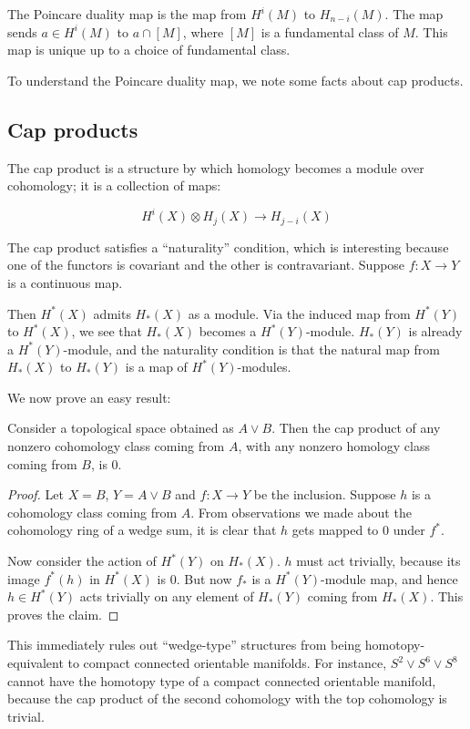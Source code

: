 \documentclass[a4paper]{amsart}
\begin{document}
The Poincare duality map is the map from $H^i(M)$ to $H_{n-i}(M)$. The
map sends $a \in H^i(M)$ to $a \cap [M]$, where $[M]$ is a fundamental
class of $M$. This map is unique up to a choice of fundamental class.

To understand the Poincare duality map, we note some facts about cap
products.

\subsection{Cap products}

The cap product is a structure by which homology becomes a module over
cohomology; it is a collection of maps:

$$H^i(X) \otimes H_j(X) \to H_{j-i}(X)$$

The cap product satisfies a ``naturality'' condition, which is
interesting because one of the functors is covariant and the other is
contravariant. Suppose $f:X \to Y$ is a continuous map.

Then $H^*(X)$ admits $H_*(X)$ as a module. Via the induced map from
$H^*(Y)$ to $H^*(X)$, we see that $H_*(X)$ becomes a
$H^*(Y)$-module. $H_*(Y)$ is already a $H^*(Y)$-module, and the
naturality condition is that the natural map from $H_*(X)$ to $H_*(Y)$
is a map of $H^*(Y)$-modules.

We now prove an easy result:

\begin{claimer}
  Consider a topological space obtained as $A \vee B$. Then the cap
  product of any nonzero cohomology class coming from $A$, with any
  nonzero homology class coming from $B$, is $0$.
\end{claimer}

\begin{proof}
  Let $X = B$, $Y = A \vee B$ and $f: X \to Y$ be the
  inclusion. Suppose $h$ is a cohomology class coming from $A$. From
  observations we made about the cohomology ring of a wedge sum, it is
  clear that $h$ gets mapped to $0$ under $f^*$.

  Now consider the action of $H^*(Y)$ on $H_*(X)$. $h$ must act
  trivially, because its image $f^*(h)$ in $H^*(X)$ is $0$. But now
  $f_*$ is a $H^*(Y)$-module map, and hence $h \in H^*(Y)$ acts
  trivially on any element of $H_*(Y)$ coming from $H_*(X)$. This
  proves the claim.
\end{proof}

This immediately rules out ``wedge-type'' structures from being
homotopy-equivalent to compact connected orientable manifolds. For
instance, $S^2 \vee S^6 \vee S^8$ cannot have the homotopy type of a
compact connected orientable manifold, because the cap product of the
second cohomology with the top cohomology is trivial.
\end{document}
